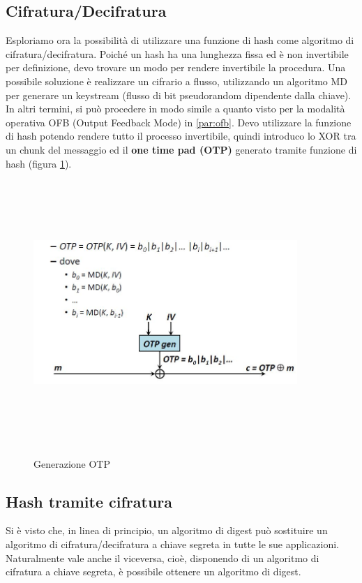 \subsection{Cifratura/Decifratura} 
Esploriamo ora la possibilità di utilizzare una funzione di hash come algoritmo di cifratura/decifratura. Poiché un hash ha una lunghezza fissa ed è non invertibile per definizione, devo trovare un modo per rendere invertibile la procedura. Una possibile soluzione è realizzare un cifrario a flusso, utilizzando un algoritmo MD per generare un keystream (flusso di bit pseudorandom dipendente dalla chiave). In altri termini, si può procedere in modo simile a quanto visto per la modalità operativa OFB (Output Feedback Mode) in \ref{par:ofb}. Devo utilizzare la funzione di hash potendo rendere tutto il processo invertibile, quindi introduco lo XOR tra un chunk del messaggio ed il \textbf{one time pad (OTP)} generato tramite funzione di hash (figura \ref{fig:otp}).
\begin{figure}
	\begin{center}
	{\includegraphics[height=10cm, width=10cm, keepaspectratio]{Immagini/hash/schema_cifratura_flusso.JPG}}
	\caption{Generazione OTP \label{fig:otp}}
	\end{center}
\end{figure}

\subsection{Hash tramite cifratura}
Si è visto che, in linea di principio, un algoritmo di digest può sostituire un algoritmo di cifratura/decifratura a chiave segreta in tutte le sue applicazioni. Naturalmente vale anche il viceversa, cioè, disponendo di un algoritmo di cifratura a chiave segreta, è possibile ottenere un algoritmo di digest.

